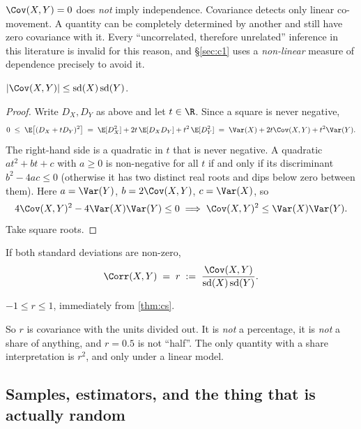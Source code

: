 \begin{remark}
$\Cov(X,Y)=0$ does \emph{not} imply independence. Covariance detects only linear
co-movement. A quantity can be completely determined by another and still have
zero covariance with it. Every ``uncorrelated, therefore unrelated'' inference in
this literature is invalid for this reason, and §\ref{sec:c1} uses a
\emph{non-linear} measure of dependence precisely to avoid it.
\end{remark}

\begin{theorem}
\label{thm:cs}
$|\Cov(X,Y)| \le \operatorname{sd}(X)\operatorname{sd}(Y)$.
\end{theorem}
\begin{proof}
Write $D_X, D_Y$ as above and let $t \in \R$. Since a square is never negative,
\[
0 \;\le\; \E\big[(D_X + tD_Y)^2\big]
  \;=\; \E[D_X^2] + 2t\,\E[D_XD_Y] + t^2\,\E[D_Y^2]
  \;=\; \Var(X) + 2t\Cov(X,Y) + t^2\Var(Y).
\]
The right-hand side is a quadratic in $t$ that is never negative. A quadratic
$at^2+bt+c$ with $a \ge 0$ is non-negative for all $t$ if and only if its
discriminant $b^2-4ac \le 0$ (otherwise it has two distinct real roots and dips
below zero between them). Here $a=\Var(Y)$, $b=2\Cov(X,Y)$, $c=\Var(X)$, so
\[
4\Cov(X,Y)^2 - 4\Var(X)\Var(Y) \le 0
\;\Longrightarrow\;
\Cov(X,Y)^2 \le \Var(X)\Var(Y).
\]
Take square roots.
\end{proof}

\begin{definition}[Correlation]
If both standard deviations are non-zero,
\[
\Corr(X,Y) \;=\; r \;:=\; \frac{\Cov(X,Y)}{\operatorname{sd}(X)\operatorname{sd}(Y)}.
\]
\end{definition}

\begin{corollary}
$-1 \le r \le 1$, immediately from \cref{thm:cs}.
\end{corollary}

So $r$ is covariance with the units divided out. It is \emph{not} a percentage,
it is \emph{not} a share of anything, and $r=0.5$ is not ``half''. The only
quantity with a share interpretation is $r^2$, and only under a linear model.

\subsection{Samples, estimators, and the thing that is actually random}

